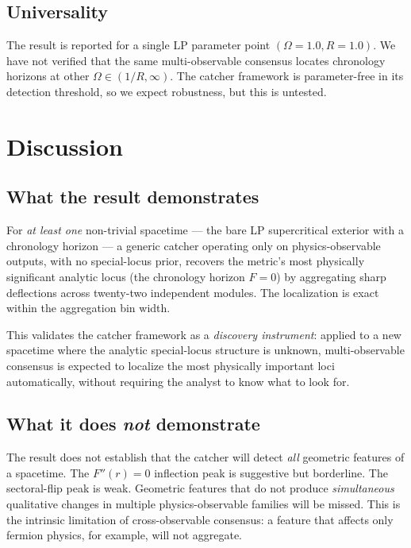 \documentclass[11pt,letterpaper]{article}
\begin{document}
\subsection{Universality}

The result is reported for a single LP parameter point $(\Omega = 1.0, R = 1.0)$. We have not verified that the same multi-observable consensus locates chronology horizons at other $\Omega \in (1/R, \infty)$. The catcher framework is parameter-free in its detection threshold, so we expect robustness, but this is untested.

\section{Discussion}\label{sec:discussion}

\subsection{What the result demonstrates}

For \emph{at least one} non-trivial spacetime --- the bare LP supercritical exterior with a chronology horizon --- a generic catcher operating only on physics-observable outputs, with no special-locus prior, recovers the metric's most physically significant analytic locus (the chronology horizon $F = 0$) by aggregating sharp deflections across twenty-two independent modules. The localization is exact within the aggregation bin width.

This validates the catcher framework as a \emph{discovery instrument}: applied to a new spacetime where the analytic special-locus structure is unknown, multi-observable consensus is expected to localize the most physically important loci automatically, without requiring the analyst to know what to look for.

\subsection{What it does \emph{not} demonstrate}

The result does not establish that the catcher will detect \emph{all} geometric features of a spacetime. The $F''(r) = 0$ inflection peak is suggestive but borderline. The sectoral-flip peak is weak. Geometric features that do not produce \emph{simultaneous} qualitative changes in multiple physics-observable families will be missed. This is the intrinsic limitation of cross-observable consensus: a feature that affects only fermion physics, for example, will not aggregate.
\end{document}
